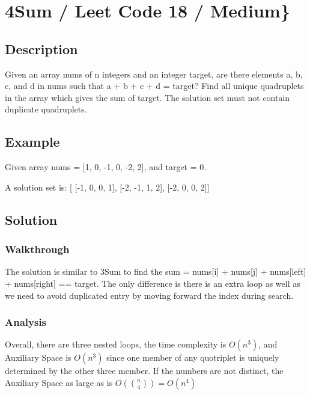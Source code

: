 \documentclass[]{book}
\begin{document}
\hypertarget{sum-leet-code-18-medium}{%
\section{4Sum / Leet Code 18 / Medium\}}\label{sum-leet-code-18-medium}}

\hypertarget{description-7}{%
\subsection{Description}\label{description-7}}

Given an array nums of n integers and an integer target, are there elements a, b, c, and d in nums such that
a + b + c + d = target? Find all unique quadruplets in the array which gives the sum of target. The solution set
must not contain duplicate quadruplets.

\hypertarget{example-6}{%
\subsection{Example}\label{example-6}}

Given array nums = {[}1, 0, -1, 0, -2, 2{]}, and target = 0.

A solution set is:
{[}
{[}-1, 0, 0, 1{]},
{[}-2, -1, 1, 2{]},
{[}-2, 0, 0, 2{]}{]}

\hypertarget{solution-6}{%
\subsection{Solution}\label{solution-6}}

\hypertarget{walkthrough-8}{%
\subsubsection{Walkthrough}\label{walkthrough-8}}

The solution is similar to 3Sum to find the sum = nums{[}i{]} + nums{[}j{]} + nums{[}left{]} + nums{[}right{]} == target. The only
difference is there is an extra loop as well as we need to avoid duplicated entry by moving forward the index
during search.

\hypertarget{analysis-8}{%
\subsubsection{Analysis}\label{analysis-8}}

Overall, there are three nested loops, the time complexity is \(O(n^3)\), and Auxiliary Space is \(O(n^3)\) since one member
of any quotriplet is uniquely determined by the other three member. If the numbers are not distinct, the Auxiliary
Space as large as is \(O(\binom{n}{4}) = O(n^4)\)
\end{document}
